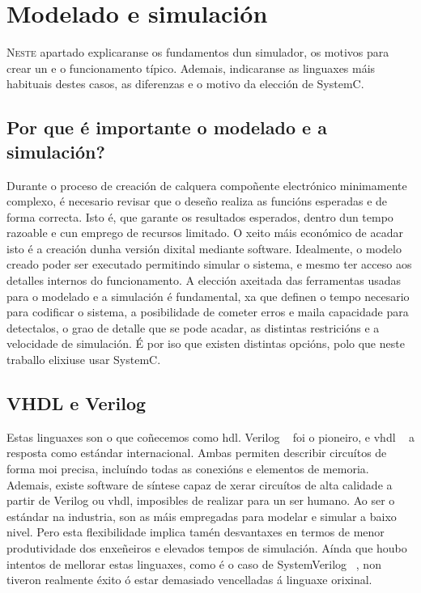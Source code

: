 \chapter{Modelado e simulación}
\label{chap:mod_sim}

\lettrine{N}{este} apartado explicaranse os fundamentos dun simulador, os motivos para crear un e o funcionamento típico. Ademais, indicaranse as linguaxes máis habituais destes casos, as diferenzas e o motivo da elección de SystemC. 

\section{Por que é importante o modelado e a simulación?}\label{sec:mod_sim}
Durante o proceso de creación de calquera compoñente electrónico minimamente complexo, é necesario revisar que o deseño realiza as funcións esperadas e de forma correcta. Isto é, que garante os resultados esperados, dentro dun tempo razoable e cun emprego de recursos limitado. O xeito máis económico de acadar isto é a creación dunha versión dixital mediante software. Idealmente, o modelo creado poder ser executado permitindo simular o sistema, e mesmo ter acceso aos detalles internos do funcionamento. A elección axeitada das ferramentas usadas para o modelado e a simulación é fundamental, xa que definen o tempo necesario para codificar o sistema, a posibilidade de cometer erros e maila capacidade para detectalos, o grao de detalle que se pode acadar, as distintas restricións e a velocidade de simulación. É por iso que existen distintas opcións, polo que neste traballo elixiuse usar SystemC.


\section{VHDL e Verilog}\label{sec:vhdl_verilog}
Estas linguaxes son o que coñecemos como \acrfull{hdl}. Verilog ~\cite{vhdl_verilog} foi o pioneiro, e \acrfull{vhdl} ~\cite{vhdl_verilog} a resposta como estándar internacional. Ambas permiten describir circuítos de forma moi precisa, incluíndo todas as conexións e elementos de memoria. Ademais, existe software de síntese capaz de xerar circuítos de alta calidade a partir de Verilog ou \acrshort{vhdl}, imposibles de realizar para un ser humano. Ao ser o estándar na industria, son as máis empregadas para modelar e simular a baixo nivel. Pero esta flexibilidade implica tamén desvantaxes en termos de menor produtividade dos enxeñeiros e elevados tempos de simulación. Aínda que houbo intentos de mellorar estas linguaxes, como é o caso de SystemVerilog ~\cite{system_verilog}, non tiveron realmente éxito ó estar demasiado vencelladas á linguaxe orixinal.

